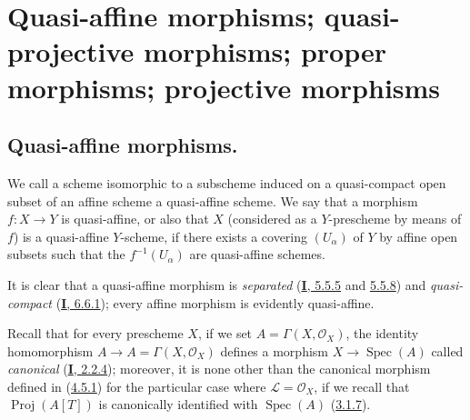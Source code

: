 \section{Quasi-affine morphisms; quasi-projective morphisms; proper
morphisms; projective morphisms}
\label{section:II.5}

\subsection{Quasi-affine morphisms.}
\label{subsection:II.5.1}

\begin{definition}[5.1.1]
\label{II.5.1.1}
We call a scheme isomorphic to a subscheme induced on a quasi-compact open
subset of an affine scheme a quasi-affine scheme. We say that a
morphism $f:X\to Y$ is quasi-affine, or also that $X$ (considered as a
$Y$-prescheme by means of $f$) is a quasi-affine $Y$-scheme, if there
exists a covering $(U_\alpha)$ of $Y$ by affine open subsets such that the
$f^{-1}(U_\alpha)$ are quasi-affine schemes.
\end{definition}

It is clear that a quasi-affine morphism is \emph{separated}
(\hyperref[I.5.5.5]{\textbf{I}, 5.5.5} and \hyperref[I.5.5.8]{5.5.8}) and
\emph{quasi-compact} (\hyperref[I.6.6.1]{\textbf{I}, 6.6.1}); every affine
morphism is evidently quasi-affine.

Recall that for every prescheme $X$, if we set
$A=\Gamma(X,\mathcal{O}_X)$, the identity homomorphism
$A\to A=\Gamma(X,\mathcal{O}_X)$ defines a morphism
$X\to\operatorname{Spec}(A)$ called \emph{canonical}
(\hyperref[I.2.2.4]{\textbf{I}, 2.2.4}); moreover, it is none other than the
canonical morphism defined in (\hyperref[II.4.5.1]{4.5.1}) for the particular
case where $\mathcal{L}=\mathcal{O}_X$, if we recall that
$\operatorname{Proj}(A[T])$ is canonically identified with
$\operatorname{Spec}(A)$ (\hyperref[II.3.1.7]{3.1.7}).


